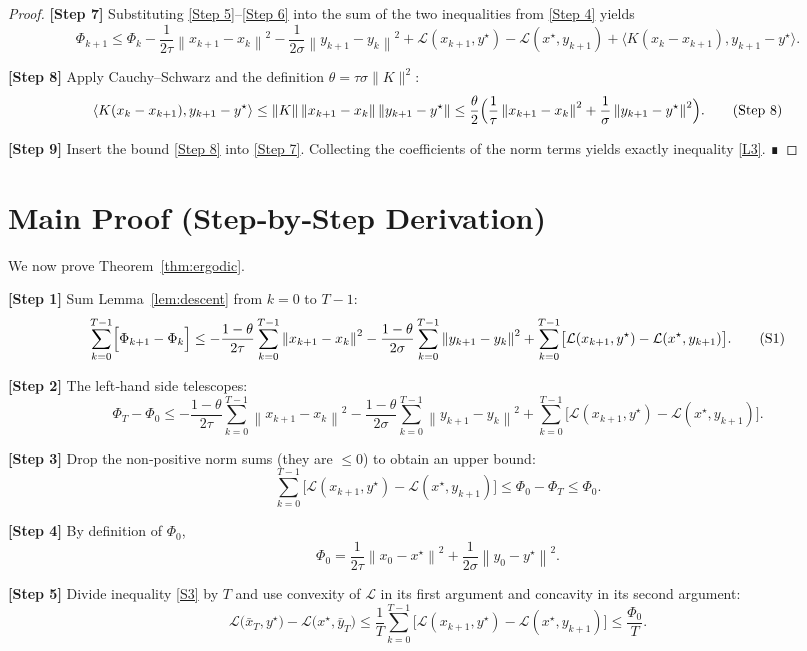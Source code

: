 \documentclass{article}
\newcommand{\norm}[1]{\left\lVert#1\right\rVert}
\begin{document}
\begin{proof}
\textbf{[Step 7]} Substituting \eqref{Step 5}–\eqref{Step 6} into the sum of the two inequalities from \eqref{Step 4} yields
\[
\Phi_{k+1}\le\Phi_{k}
-\frac{1}{2\tau}\norm{x_{k+1}-x_{k}}^{2}
-\frac{1}{2\sigma}\norm{y_{k+1}-y_{k}}^{2}
+\mathcal L(x_{k+1},y^{\star})-\mathcal L(x^{\star},y_{k+1})
+\langle K(x_{k}-x_{k+1}),y_{k+1}-y^{\star}\rangle .
\tag{Step 7}
\]

\textbf{[Step 8]} Apply Cauchy–Schwarz and the definition $\theta=\tau\sigma\|K\|^{2}$:
\[
\langle K(x_{k}-x_{k+1}),y_{k+1}-y^{\star}\rangle
\le \|K\|\norm{x_{k+1}-x_{k}}\norm{y_{k+1}-y^{\star}}
\le \frac{\theta}{2}\Bigl(\frac{1}{\tau}\norm{x_{k+1}-x_{k}}^{2}
+\frac{1}{\sigma}\norm{y_{k+1}-y^{\star}}^{2}\Bigr).
\tag{Step 8}
\]

\textbf{[Step 9]} Insert the bound \eqref{Step 8} into \eqref{Step 7}. Collecting the coefficients of the norm terms yields exactly inequality \eqref{L3}. ∎
\end{proof}

\section*{Main Proof (Step‑by‑Step Derivation)}
We now prove Theorem~\ref{thm:ergodic}.

\textbf{[Step 1]} Sum Lemma~\ref{lem:descent} from $k=0$ to $T-1$:
\[
\sum_{k=0}^{T-1}\Bigl[\Phi_{k+1}-\Phi_{k}\Bigr]
\le
-\frac{1-\theta}{2\tau}\sum_{k=0}^{T-1}\norm{x_{k+1}-x_{k}}^{2}
-\frac{1-\theta}{2\sigma}\sum_{k=0}^{T-1}\norm{y_{k+1}-y_{k}}^{2}
+\sum_{k=0}^{T-1}\bigl[\mathcal L(x_{k+1},y^{\star})-\mathcal L(x^{\star},y_{k+1})\bigr].
\tag{S1}
\]

\textbf{[Step 2]} The left‑hand side telescopes:
\[
\Phi_{T}-\Phi_{0}\le
-\frac{1-\theta}{2\tau}\sum_{k=0}^{T-1}\norm{x_{k+1}-x_{k}}^{2}
-\frac{1-\theta}{2\sigma}\sum_{k=0}^{T-1}\norm{y_{k+1}-y_{k}}^{2}
+\sum_{k=0}^{T-1}\bigl[\mathcal L(x_{k+1},y^{\star})-\mathcal L(x^{\star},y_{k+1})\bigr].
\tag{S2}
\]

\textbf{[Step 3]} Drop the non‑positive norm sums (they are $\le0$) to obtain an upper bound:
\[
\sum_{k=0}^{T-1}\bigl[\mathcal L(x_{k+1},y^{\star})-\mathcal L(x^{\star},y_{k+1})\bigr]
\le \Phi_{0}-\Phi_{T}
\le \Phi_{0}.
\tag{S3}
\]

\textbf{[Step 4]} By definition of $\Phi_{0}$,
\[
\Phi_{0}= \frac{1}{2\tau}\norm{x_{0}-x^{\star}}^{2}
+\frac{1}{2\sigma}\norm{y_{0}-y^{\star}}^{2}.
\tag{S4}
\]

\textbf{[Step 5]} Divide inequality \eqref{S3} by $T$ and use convexity of $\mathcal L$ in its first argument and concavity in its second argument:
\[
\mathcal L\!\bigl(\bar x_{T},y^{\star}\bigr)-\mathcal L\!\bigl(x^{\star},\bar y_{T}\bigr)
\le \frac{1}{T}\sum_{k=0}^{T-1}\bigl[\mathcal L(x_{k+1},y^{\star})-\mathcal L(x^{\star},y_{k+1})\bigr]
\le \frac{\Phi_{0}}{T}.
\tag{S5}
\]
\end{document}
